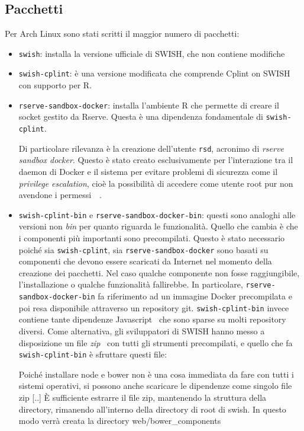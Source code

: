 \documentclass[10pt,titlepage,twoside,a4paper]{report}
\begin{document}
\subsection{Pacchetti}
Per Arch Linux sono stati scritti il maggior numero di pacchetti:
\begin{itemize}
    \item \texttt{swish}: installa la versione ufficiale di SWISH, che non 
contiene modifiche

    \item \texttt{swish-cplint}: è una versione modificata che comprende 
Cplint on SWISH con supporto per R.

    \item \texttt{rserve-sandbox-docker}: installa l'ambiente R che permette di 
creare il socket gestito da Rserve. Questa è una dipendenza fondamentale di 
\texttt{swish-cplint}.

Di particolare rilevanza è la creazione dell'utente \texttt{rsd}, acronimo di 
\emph{rserve sandbox docker}. Questo è stato creato esclusivamente per 
l'interazione tra il daemon di Docker e il sistema per 
evitare problemi di sicurezza come il \emph{privilege escalation}, cioè la 
possibilità di accedere come utente root pur non avendone i 
permessi~\cite{dockerPrivilegeEscalation0}~\cite{dockerPrivilegeEscalation1}.

    \item \texttt{swish-cplint-bin} e \texttt{rserve-sandbox-docker-bin}: 
questi sono analoghi alle versioni non \emph{bin} per quanto riguarda le 
funzionalità. Quello che cambia è che i componenti più importanti sono 
precompilati. Questo è stato necessario poiché sia \texttt{swish-cplint}, 
sia \texttt{rserve-sandbox-docker} sono basati su componenti che devono essere 
scaricati da Internet nel momento della creazione dei pacchetti. Nel caso 
qualche componente non fosse raggiungibile, l'installazione o qualche 
funzionalità fallirebbe. In particolare, \texttt{rserve-sandbox-docker-bin} 
fa riferimento ad un immagine Docker precompilata e poi resa disponibile 
attraverso un repository git. \texttt{swish-cplint-bin} invece contiene tante 
dipendenze Javascript~\cite{javascriptDepsSWISH} che sono sparse su molti 
repository diversi. Come alternativa, gli sviluppatori 
di SWISH hanno messo a disposizione un file \emph{zip}~\cite{swishWebDepsZip} 
con tutti gli strumenti precompilati, e quello che fa \texttt{swish-cplint-bin}
è sfruttare questi file:
\begin{displayquote}
[..]
Poiché installare node e bower non è una cosa immediata da fare con tutti i 
sistemi operativi, si possono anche scaricare le dipendenze come singolo file 
zip [..] È sufficiente estrarre il file zip, mantenendo la struttura della 
directory,  rimanendo all'interno della directory di root di swish. In questo 
modo verrà creata la directory web/bower\_components
\end{displayquote}
\end{itemize}
\end{document}
